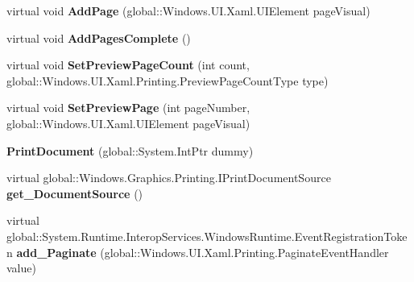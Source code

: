 \begin{DoxyCompactItemize}
virtual void {\bfseries Add\+Page} (global\+::\+Windows.\+U\+I.\+Xaml.\+U\+I\+Element page\+Visual)
\item 
\mbox{\label{class_windows_1_1_u_i_1_1_xaml_1_1_printing_1_1_print_document_a86b1ab90c519769c55161873f7402602}} 
virtual void {\bfseries Add\+Pages\+Complete} ()
\item 
\mbox{\label{class_windows_1_1_u_i_1_1_xaml_1_1_printing_1_1_print_document_acdb1e1f03c6ad6617b2045feee076bb1}} 
virtual void {\bfseries Set\+Preview\+Page\+Count} (int count, global\+::\+Windows.\+U\+I.\+Xaml.\+Printing.\+Preview\+Page\+Count\+Type type)
\item 
\mbox{\label{class_windows_1_1_u_i_1_1_xaml_1_1_printing_1_1_print_document_a9b89dc73b3d3108f6a9a5bbda7805863}} 
virtual void {\bfseries Set\+Preview\+Page} (int page\+Number, global\+::\+Windows.\+U\+I.\+Xaml.\+U\+I\+Element page\+Visual)
\item 
\mbox{\label{class_windows_1_1_u_i_1_1_xaml_1_1_printing_1_1_print_document_ac0c6ca7b864f685e2f0989f778c41e72}} 
{\bfseries Print\+Document} (global\+::\+System.\+Int\+Ptr dummy)
\item 
\mbox{\label{class_windows_1_1_u_i_1_1_xaml_1_1_printing_1_1_print_document_a58bc53aad6d052d4b2a25935ba3f7844}} 
virtual global\+::\+Windows.\+Graphics.\+Printing.\+I\+Print\+Document\+Source {\bfseries get\+\_\+\+Document\+Source} ()
\item 
\mbox{\label{class_windows_1_1_u_i_1_1_xaml_1_1_printing_1_1_print_document_a9c15072b2efeea170b01106af19c20d2}} 
virtual global\+::\+System.\+Runtime.\+Interop\+Services.\+Windows\+Runtime.\+Event\+Registration\+Token {\bfseries add\+\_\+\+Paginate} (global\+::\+Windows.\+U\+I.\+Xaml.\+Printing.\+Paginate\+Event\+Handler value)
\item 
\mbox{\label{class_windows_1_1_u_i_1_1_xaml_1_1_printing_1_1_print_document_af8447e29ab1c6aeff221a7ecf57c48a5}} 

\end{DoxyCompactItemize}
